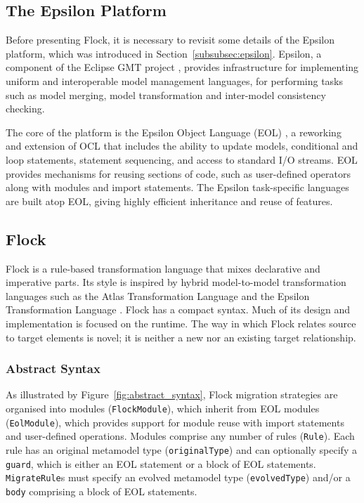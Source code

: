 \subsection{The Epsilon Platform}
\label{subsec:epsilon}
Before presenting Flock, it is necessary to revisit some details of the Epsilon \cite{kolovos09thesis} platform, which was introduced in Section~\ref{subsubsec:epsilon}. Epsilon, a component of the Eclipse GMT project \cite{gmt}, provides infrastructure for implementing uniform and interoperable model management languages, for performing tasks such as model merging, model transformation and inter-model consistency checking. 

The core of the platform is the Epsilon Object Language (EOL) \cite{kolovos06eol}, a reworking and extension of OCL that includes the ability to update models, conditional and loop statements, statement sequencing, and access to standard I/O streams. EOL provides mechanisms for reusing sections of code, such as user-defined operators along with modules and import statements. The Epsilon task-specific languages are built atop EOL, giving highly efficient inheritance and reuse of features.

\subsection{Flock}
Flock is a rule-based transformation language that mixes declarative and imperative parts. Its style is inspired by hybrid model-to-model transformation languages such as the Atlas Transformation Language \cite{jouault05transforming} and the Epsilon Transformation Language \cite{kolovos08etl}. Flock has a compact syntax. Much of its design and implementation is focused on the runtime. The way in which Flock relates source to target elements is novel; it is neither a new nor an existing target relationship. 

\subsubsection{Abstract Syntax}
\label{subsubsec:abstract_syntax}
As illustrated by Figure~\ref{fig:abstract_syntax}, Flock migration strategies are organised into modules (\texttt{Fl\-ockMo\-du\-le}), which inherit from EOL modules (\texttt{Eo\-lMod\-ule}), which provides support for module reuse with import statements and user-defined operations. Modules comprise any number of rules (\texttt{Ru\-le}). Each rule has an original metamodel type (\texttt{or\-ig\-in\-alTy\-pe}) and can optionally specify a \texttt{gu\-ard}, which is either an EOL statement or a block of EOL statements. \texttt{Mi\-gr\-ateRu\-le}s must specify an evolved metamodel type (\texttt{ev\-ol\-vedTy\-pe}) and/or a \texttt{bo\-dy} comprising a block of EOL statements.

